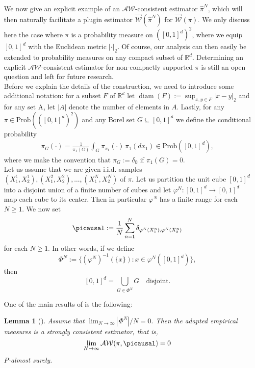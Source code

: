 \documentclass[10pt]{amsart}
\newtheorem{lemma}[theorem]{Lemma}
\newcommand{\R}{\mathbb{R}}
\begin{document}
We now give an explicit example of an $\mathcal{AW}$-consistent estimator $\hat{\pi}^N$, which will then naturally facilitate a plugin estimator $\overrightarrow{\mathcal{W}}(\hat{\pi}^N)$ for $\overrightarrow{\mathcal{W}}(\pi)$. We only discuss here the case where $\pi$ is a probability measure on $([0,1]^d)^2$, where we equip $[0,1]^d$ with the Euclidean metric $|\cdot|_2$. Of course, our analysis can then easily be extended to probability measures on any compact subset of $\R^d$. Determining an explicit $\mathcal{AW}$-consistent estimator for non-compactly supported $\pi$ is still an open question and left for future research.\\ %
Before we explain the details of the construction, we need to introduce some additional notation: for a subset $F$ of $\R^d$ let  $\mathop{\mathrm{diam}} (F):=\sup_{x,y\in F} |x-y|_2$ and for any set A, let $|A|$ denote the number of elements in $A$. Lastly, for any $\pi\in \text{Prob}(([0,1]^d)^2)$ and any Borel set $G\subseteq [0,1]^d$ we define the conditional probability
\begin{align*}
\pi_G(\cdot)=\frac{1}{\pi_1(G)} \int_G \pi_{x_1}(\cdot)\,\pi_1(dx_1)\in \text{Prob}([0,1]^d),
\end{align*}
where we make the convention that $\pi_G:=\delta_{0}$ if $\pi_1(G)=0$.
\\
 
Let us assume that we are given i.i.d. samples $(X_1^1, X_2^1), (X_1^2, X_2^2), \dots, (X_1^N, X_2^N) $ of $\pi$. Let us partition the unit cube $[0,1]^d$ into a disjoint union of a finite number of cubes and let $\varphi^N \colon[0,1]^d\to[0,1]^d$ map each cube to its center. Then in particular $\varphi^N$ has a finite range for each $N\ge 1$. We now set
	\[ \picausal:=\frac{1}{N}\sum_{n=1}^N \delta_{\varphi^N(X_1^n),\varphi^N(X_2^n)} \]
	for each $N\geq 1$. In other words, if we define
\[\Phi^N:=\big\{(\varphi^N)^{-1}(\{x\}) : x\in \varphi^N([0,1]^d) \big\},\]
then
\[ [0,1]^d=\bigcup_{G\in \Phi^N} G \quad\text{disjoint.}
\]

One of the main results of \cite{backhoff2020estimating} is the following:
\begin{lemma}[{\cite[Theorem 1.3]{backhoff2020estimating}}]
\label{thm:almost.sure.convergence}
	Assume that $\lim_{N\to \infty} |\Phi^N|/N=0$. Then the adapted empirical measures is a strongly consistent estimator, that is, 
	\[  \lim_{N\to\infty} \mathcal{AW}(\pi,\picausal) = 0 \]	
	$P$-almost surely.
\end{lemma}
\end{document}
